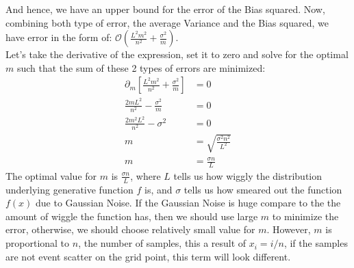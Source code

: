 \documentclass[]{article}
\begin{document}
        And hence, we have an upper bound for the error of the Bias squared. Now, combining both type of error, the average Variance and the Bias squared, we have error in the form of: $\mathcal{O}(\frac{L^2m^2}{n^2} + \frac{\sigma^2}{m})$. 
        \\[1em]
        Let's take the derivative of the expression, set it to zero and solve for the optimal $m$ such that the sum of these 2 types of errors are minimized: 
        \begin{align*}\tag{B.1.e.3}\label{eqn:B.1.e.3}
            \partial_m 
            \left[ 
                \frac{L^2m^2}{n^2} + \frac{\sigma^2}{m}
            \right] &= 0
            \\
            \frac{2mL^2}{n^2} - \frac{\sigma^2}{m} &= 0
            \\
            \frac{2m^2L^2}{n^2} - \sigma^2 &= 0
            \\
            m &= \sqrt{\frac{\sigma^2 n^2}{L^2}}
            \\
            m &= \frac{\sigma n}{L}
        \end{align*}
        The optimal value for $m$ is $\frac{\sigma n}{L}$, where $L$ tells us how wiggly the distribution underlying generative function $f$ is, and $\sigma$ tells us how smeared out the function $f(x)$ due to Gaussian Noise. If the Gaussian Noise is huge compare to the the amount of wiggle the function has, then we should use large $m$ to minimize the error, otherwise, we should choose relatively small value for $m$. However, $m$ is proportional to $n$, the number of samples, this a result of $x_i = i/n$, if the samples are not event scatter on the grid point, this term will look different. 
        
\end{document}
